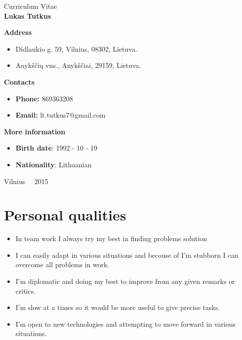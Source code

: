 \documentclass[a4paper,12pt]{article}
\begin{document}
\graphicspath{ {/} }

\renewcommand{\cftdot}{.}	
\renewcommand{\cftsecleader}{\cftdotfill{\cftdotsep}}

\thispagestyle{empty} %


\begin{center}
 Curriculum Vitae\\
\textbf{Lukas Tutkus} \\

\vspace{5cm}

\textbf{Address}
\begin{itemize}
	\item Didlaukio g. 59, Vilnius, 08302, Lietuva. 
	\item Anykščių vns., Anykščiai, 29159, Lietuva.
\end{itemize}

\textbf{Contacts}
\begin{itemize}
	\item \textbf{Phone:} 869363208
	\item \textbf{Email:} lt.tutkus7@gmail.com
\end{itemize}

\textbf{More information}
\begin{itemize}
	\item \textbf{Birth date}: 1992 - 10 - 19
	\item \textbf{Nationality}: Lithuanian
\end{itemize}
\vfill

Vilnius \ \  2015
\end{center}



\clearpage

\section{Personal qualities}
\begin{itemize}
	\item In team work I always try my best in finding problems solution
	\item I can easily adapt in various situations and  becouse of I'm stubborn I can overcome all problems in work.
	\item I'm diplomatic and doing my best to improve from any given remarks or critics.
	\item I'm slow at a times so it would be more useful to give precise tasks.
	\item I'm open to new technologies and attempting to move forward in various situations.
\end{itemize}
\end{document}
